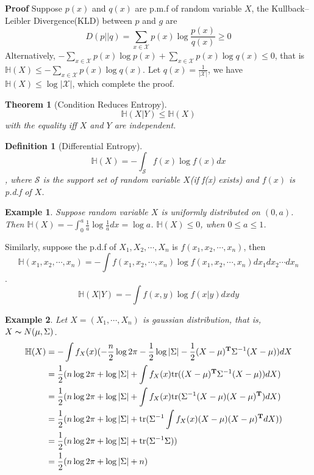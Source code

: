 \documentclass[11pt]{article}
\def\T{{\bf T}}
\def\tr{\mathrm{tr}}
\newtheorem{theorem}{Theorem}[section]
\newtheorem{definition}{Definition}[section]
\newtheorem{example}{Example}[section]
\begin{document}
{\bf Proof} Suppose $p(x)$ and $q(x)$ are p.m.f of random variable $X$, the  Kullback–Leibler Divergence(KLD) between $p$ and $g$ are
$$D(p||q)=\sum\limits_{x \in \mathcal{X}}p(x)\log \frac{p(x)}{q(x)}\geq 0$$
Alternatively, $-\sum\limits_{x \in \mathcal{X}}p(x)\log p(x) + \sum\limits_{x \in \mathcal{X}}p(x)\log q(x)\leq0$, that is $\mathbb{H}(X)\leq-\sum\limits_{x \in \mathcal{X}}p(x)\log q(x)$. Let $q(x)=\frac{1}{|\mathcal{X}|}$, we have $\mathbb{H}(X)\leq\log|\mathcal{X}|$, which complete the proof.
\begin{theorem}[Condition Reduces Entropy]
$$\mathbb{H}(X|Y)\leq\mathbb{H}(X)$$ with the equality iff $X$ and $Y$ are independent.
\end{theorem}
\begin{definition}[Differential Entropy]
$$\mathbb{H}(X)=-\int_{\mathcal{S}}f(x)\log f(x)dx$$, where $\mathcal{S}$ is the support set of random variable $X$(if f(x) exists) and $f(x)$ is p.d.f of $X$.
\end{definition}
\begin{example}
Suppose random variable $X$ is uniformly distributed on $\left(0,a\right)$. Then
$\mathbb{H}(X)=-\int_{0}^{a}\frac{1}{a}\log \frac{1}{a}dx=\log a$. $\mathbb{H}(X)\leq0$, when $0\leq a\leq1$.
\end{example}
Similarly, suppose the p.d.f of $X_{1},X_{2},\cdots,X_{n}$ is $f(x_{1},x_{2},\cdots,x_{n})$, then $$\mathbb{H}(x_{1},x_{2},\cdots,x_{n})=-\int f(x_{1},x_{2},\cdots,x_{n})\log f(x_{1},x_{2},\cdots,x_{n})dx_{1}dx_{2}\cdots dx_{n}$$.
$$\mathbb{H}(X|Y)=-\int f(x,y)\log f(x|y)dxdy$$
\begin{example}
Let $X=(X_{1},\cdots,X_{n})$ is gaussian distribution, that is, $X\thicksim N(\mu,\Sigma)$.
\[
\begin{split}
\mathbb{H}(X) &= -\int f_{X}(x)(-\frac{n}{2}\log 2\pi - \frac{1}{2}\log |\Sigma|-\frac{1}{2}(X-\mu)^{\T}\Sigma^{-1}(X-\mu))dX \\
              &=\frac{1}{2}(n\log 2\pi +\log |\Sigma|+\int f_{X}(x)\tr((X-\mu)^{\T}\Sigma^{-1}(X-\mu))dX) \\
              &=\frac{1}{2}(n\log 2\pi +\log |\Sigma|+\int f_{X}(x)\tr(\Sigma^{-1}(X-\mu)(X-\mu)^{\T})dX) \\
               &=\frac{1}{2}(n\log 2\pi +\log |\Sigma|+\tr(\Sigma^{-1}\int f_{X}(x)(X-\mu)(X-\mu)^{\T}dX)) \\
               &=\frac{1}{2}(n\log 2\pi +\log |\Sigma|+\tr(\Sigma^{-1}\Sigma)) \\
               &=\frac{1}{2}(n\log 2\pi +\log |\Sigma|+n) \\
\end{split}
\]
\end{example}
\end{document}
